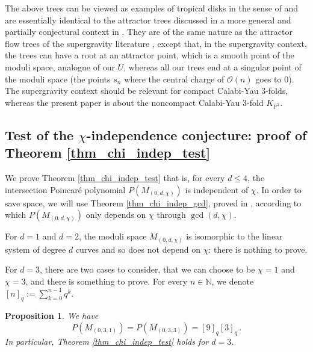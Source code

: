 \documentclass[12pt, a4paper]{amsart}
\newtheorem{prop}[defn]{Proposition}
\newcommand\NN{\mathbb N}
\newcommand\PP{\mathbb P}
\newcommand\cO{\mathcal O}
\begin{document}
The above trees can be viewed as examples of tropical disks in the sense of 
\cite[Definition 5.1]{cps} and are
essentially identical to the attractor trees discussed in a more general and partially conjectural context in
\cite[\S 3.2]{MR3330788}. They are of the same nature as the attractor flow trees of the supergravity literature 
\cite{MR1792870}, except that, in the supergravity context, the trees can have a root at an attractor point, which is a smooth point of the moduli space, analogue of our $U$, whereas all our trees end at a singular point of the moduli space
(the points $s_n$ where the central charge of $\cO(n)$ goes to $0$). The supergravity context should be relevant for compact Calabi-Yau 3-folds, whereas the present paper is about the noncompact Calabi-Yau 3-fold $K_{\PP^2}$.



\subsection{Test of the $\chi$-independence conjecture: proof of Theorem \ref{thm_chi_indep_test}} \label{section_chi_indep}

We prove Theorem \ref{thm_chi_indep_test} that is, for every $d \leq 4$, the intersection 
Poincar\'e polynomial $P(M_{(0,d,\chi)})$ is independent of $\chi$.
In order to save space, we will use Theorem \ref{thm_chi_indep_gcd}, proved 
in \cite{bousseau2019takahashi}, according to which 
$P(M_{(0,d,\chi)})$ only depends on $\chi$ through $\gcd(d,\chi)$. 

For $d=1$ and $d=2$, the moduli space $M_{(0,d,\chi)}$ is isomorphic to the linear system of degree $d$ curves and so does not depend on $\chi$: there is nothing to prove.

For $d=3$, there are two cases to consider, that we can choose to be $\chi=1$
and $\chi=3$, and there is something to prove.
For every $n \in \NN$, we denote $[n]_q:=\sum_{k=0}^{n-1}q^k$. 

\begin{prop}
We have 
\[ P(M_{(0,3,1)})=P(M_{(0,3,3)})=[9]_q [3]_q\,.\]
In particular, Theorem \ref{thm_chi_indep_test} holds for $d=3$.
\end{prop}
\end{document}
